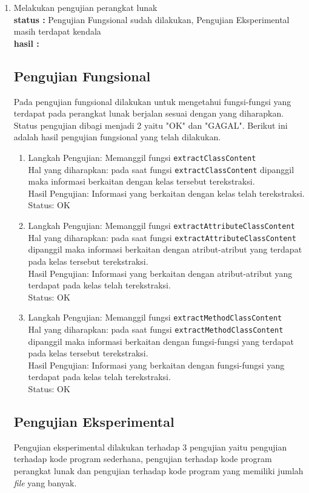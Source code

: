 \documentclass[a4paper,twoside]{article}
\begin{document}
\begin{enumerate}
		\item Melakukan pengujian perangkat lunak\\
		{\bf status :} Pengujian Fungsional sudah dilakukan, Pengujian Eksperimental masih terdapat kendala \\
		{\bf hasil :} \subsection{Pengujian Fungsional}
\label{sec:pengujian fungsional}
Pada pengujian fungsional dilakukan untuk mengetahui fungsi-fungsi yang terdapat pada perangkat lunak berjalan sesuai dengan yang diharapkan. Status pengujian dibagi menjadi 2 yaitu "OK" dan "GAGAL". Berikut ini adalah hasil pengujian fungsional yang telah dilakukan.
\begin{enumerate}
	\item Langkah Pengujian: Memanggil fungsi \texttt{extractClassContent}\\
	Hal yang diharapkan: pada saat fungsi \texttt{extractClassContent} dipanggil maka informasi berkaitan dengan kelas tersebut terekstraksi.\\
	Hasil Pengujian: Informasi yang berkaitan dengan kelas telah terekstraksi.\\
	Status: OK
	\item Langkah Pengujian: Memanggil fungsi \texttt{extractAttributeClassContent}\\
	Hal yang diharapkan: pada saat fungsi \texttt{extractAttributeClassContent} dipanggil maka informasi berkaitan dengan atribut-atribut yang terdapat pada kelas tersebut terekstraksi.\\
	Hasil Pengujian: Informasi yang berkaitan dengan atribut-atribut yang terdapat pada kelas telah terekstraksi.\\
	Status: OK
	\item Langkah Pengujian: Memanggil fungsi \texttt{extractMethodClassContent}\\
	Hal yang diharapkan: pada saat fungsi \texttt{extractMethodClassContent} dipanggil maka informasi berkaitan dengan fungsi-fungsi yang terdapat pada kelas tersebut terekstraksi.\\
	Hasil Pengujian: Informasi yang berkaitan dengan fungsi-fungsi yang terdapat pada kelas telah terekstraksi.\\
	Status: OK
\end{enumerate}

\subsection{Pengujian Eksperimental}
\label{sec:pengujian eksperimental}
Pengujian eksperimental dilakukan terhadap 3 pengujian yaitu pengujian terhadap kode program sederhana, pengujian terhadap kode program perangkat lunak dan pengujian terhadap kode program yang memiliki jumlah {\it file} yang banyak.


\end{enumerate}
\end{document}
